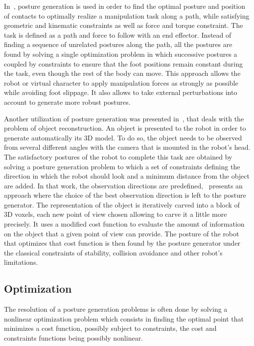 In~\cite{liu:acm:2012}, posture generation is used in order to find the optimal posture and position of contacts to optimally realize a manipulation task along a path, while satisfying geometric and kinematic constraints as well as force and torque constraint.
The task is defined as a path and force to follow with an end effector.
Instead of finding a sequence of unrelated postures along the path, all the postures are found by solving a single optimization problem in which successive postures a coupled by constraints to ensure that the foot positions remain constant during the task, even though the rest of the body can move.
This approach allows the robot or virtual character to apply manipulation forces as strongly as possible while avoiding foot slippage.
It also allows to take external perturbations into account to generate more robust postures.

Another utilization of posture generation was presented in~\cite{stasse:humanoids:2007}, that deals with the problem of object reconstruction.
An object is presented to the robot in order to generate automatically its 3D model.
To do so, the object needs to be observed from several different angles with the camera that is mounted in the robot's head.
The satisfactory postures of the robot to complete this task are obtained by solving a posture generation problem to which a set of constraints defining the direction in which the robot should look and a minimum distance from the object are added.
In that work, the observation directions are predefined,~\cite{foissotte:humanoids:2008} presents an approach where the choice of the best observation direction is left to the posture generator.
The representation of the object is iteratively carved into a block of 3D voxels, each new point of view chosen allowing to carve it a little more precisely.
It uses a modified cost function to evaluate the amount of information on the object that a given point of view can provide.
The posture of the robot that optimizes that cost function is then found by the posture generator under the classical constraints of stability, collision avoidance and other robot's limitations.



\subsection{Optimization}
\label{sub:optimization}

The resolution of a posture generation problems is often done by solving a nonlinear optimization problem which consists in finding the optimal point that minimizes a cost function, possibly subject to constraints, the cost and constraints functions being possibly nonlinear.

